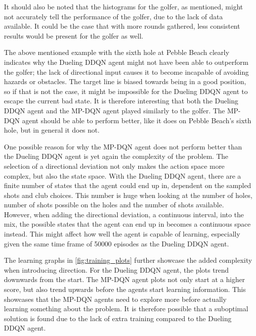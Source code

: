 \documentclass{kththesis}
\begin{document}
It should also be noted that the histograms for the golfer, as mentioned, might not accurately tell the performance of the golfer, due to the lack of data available. It could be the case that with more rounds gathered, less consistent results would be present for the golfer as well. 

The above mentioned example with the sixth hole at Pebble Beach clearly indicates why the Dueling DDQN agent might not have been able to outperform the golfer; the lack of directional input causes it to become incapable of avoiding hazards or obstacles. The target line is biased towards being in a good position, so if that is not the case, it might be impossible for the Dueling DDQN agent to escape the current bad state. It is therefore interesting that both the Dueling DDQN agent and the MP-DQN agent played similarly to the golfer. The MP-DQN agent should be able to perform better, like it does on Pebble Beach's sixth hole, but in general it does not. 

One possible reason for why the MP-DQN agent does not perform better than the Dueling DDQN agent is yet again the complexity of the problem. The selection of a directional deviation not only makes the action space more complex, but also the state space. With the Dueling DDQN agent, there are a finite number of states that the agent could end up in, dependent on the sampled shots and club choices. This number is huge when looking at the number of holes, number of shots possible on the holes and the number of shots available. However, when adding the directional deviation, a continuous interval, into the mix, the possible states that the agent can end up in becomes a continuous space instead. This might affect how well the agent is capable of learning, especially given the same time frame of 50000 episodes as the Dueling DDQN agent.

The learning graphs in \autoref{fig:training_plots} further showcase the added complexity when introducing direction. For the Dueling DDQN agent, the plots trend downwards from the start. The MP-DQN agent plots not only start at a higher score, but also trend upwards before the agents start learning information. This showcases that the MP-DQN agents need to explore more before actually learning something about the problem. It is therefore possible that a suboptimal solution is found due to the lack of extra training compared to the Dueling DDQN agent.
\end{document}
